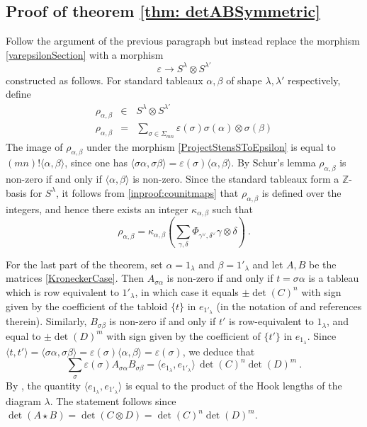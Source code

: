 \documentclass[10pt]{amsart}
\theoremstyle{definition}
\theoremstyle{remark}
\numberwithin{equation}{section}
\newcommand{\To}{\longrightarrow}
\newcommand{\Z}{\mathbb Z}
\newcommand{\lf}{\langle}
\newcommand{\rf}{\rangle}
\newcommand{\0}{\color{blue}{\mathsf{0}}}
\begin{document}
  \subsection{Proof of theorem \ref{thm: detABSymmetric}}
 Follow the argument of the previous paragraph but instead replace the morphism  \eqref{varepsilonSection}
with  a morphism 
  \[ \varepsilon \To S^{\lambda} \otimes S^{\lambda'} \]
constructed as follows. For  standard tableaux $\alpha, \beta$  of shape $\lambda, \lambda'$ respectively,  define
\begin{eqnarray} 
\rho_{\alpha,\beta}  & \in &  S^{\lambda} \otimes S^{\lambda'} \nonumber \\
\rho_{\alpha,\beta} & = & \sum_{\sigma \in \Sigma_{mn}}  \varepsilon(\sigma) \sigma(\alpha) \otimes \sigma(\beta)\nonumber
\end{eqnarray} 
 The image of $\rho_{\alpha, \beta} $  under the morphism \eqref{ProjectStensSToEpsilon} is equal to $(mn)! \lf \alpha,\beta \rf$, since one has $\lf \sigma\alpha, \sigma \beta\rf = \varepsilon(\sigma) \lf \alpha, \beta \rf$. By Schur's lemma $\rho_{\alpha,\beta}$ is non-zero if and only if $\lf \alpha, \beta \rf$ is non-zero. 
 Since the standard tableaux form a $\Z$-basis for $S^{\lambda}$, it follows from \eqref{inproof:counitmaps} that $\rho_{\alpha,\beta}$ is defined over the integers, and hence there exists an integer $\kappa_{\alpha,\beta}$ such that
 \[ \rho_{\alpha,\beta} = \kappa_{\alpha, \beta} \left( \sum_{\gamma, \delta} \Phi_{\gamma^{\vee}, \delta^{\vee}} \gamma \otimes \delta \right)\ .\]
 

   
  For the last part of the theorem,  set $\alpha =1_{\lambda}$ and $\beta = 1'_{\lambda}$ and let $A, B$ be the matrices \eqref{KroneckerCase}. Then $A_{\sigma \alpha}$ is non-zero if and only if $t=\sigma \alpha$  is a tableau which is row equivalent to $1'_{\lambda}$, in which case it equals $ \pm \det(C)^n$ with sign  given by the coefficient of the tabloid $\{t\} $ in $e_{1'_{\lambda}}$ (in the notation of  \cite{Fayers} and references therein).
   Similarly, $B_{\sigma \beta}$ is non-zero if and only if $t'$ is  row-equivalent to $1_{\lambda}$, and equal to $\pm \det(D)^m$ with sign given by the coefficient of $\{t'\}$ in $e_{1_{\lambda}}$.  Since $\lf t,t' \rf = \lf \sigma \alpha, \sigma \beta \rf = \varepsilon(\sigma) \lf \alpha,\beta \rf = \varepsilon(\sigma)$, we deduce that 
   \[ \sum_{\sigma} \varepsilon(\sigma) A_{\sigma \alpha} B_{\sigma \beta} =  \lf  e_{1_{\lambda}}, e_{1'_{\lambda}}  \rf \, \det(C)^n \det(D)^m \ .\]
 By \cite[Lemma 4.6]{Fayers}, the quantity $ \lf   e_{1_{\lambda}}, e_{1'_{\lambda}}  \rf $  is equal to  the product of  the Hook lengths of the diagram $\lambda$. The statement follows since
 $\det(A\star B) = \det(C \otimes D) = \det(C)^n \det(D)^m$. 
\end{document}
